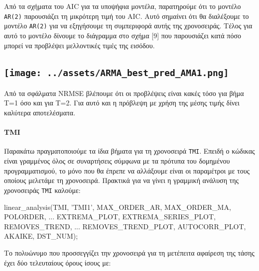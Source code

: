 \documentclass[11pt,]{article}
\newenvironment{Shaded}{}{}
\newcommand{\NormalTok}[1]{#1}
\newcommand{\StringTok}[1]{\textcolor[rgb]{0.25,0.44,0.63}{#1}}
\let\oldparagraph\paragraph
\renewcommand{\paragraph}[1]{\oldparagraph{#1}\mbox{}}
\begin{document}
Από τα σχήματα του AIC για τα υποψήφια μοντέλα, παρατηρούμε ότι το
μοντέλο \texttt{AR(2)} παρουσιάζει τη μικρότερη τιμή του AIC. Αυτό
σημαίνει ότι θα διαλέξουμε το μοντέλο \texttt{AR(2)} για να εξηγήσουμε
τη συμπεριφορά αυτής της χρονοσειράς. Τέλος για αυτό το μοντέλο δίνουμε
το διάγραμμα στο σχήμα {[}9{]} που παρουσιάζει κατά πόσο μπορεί να
προβλέψει μελλοντικές τιμές της εισόδου.

\hypertarget{ux3c0ux3c1ux3bfux3b2ux3bbux3adux3c8ux3b5ux3b9ux3c2-ux3c4ux3b9ux3bcux3ceux3bd-ux3b3ux3b9ux3b1-ux3c4ux3bf-ux3baux3b1ux3bbux3cdux3c4ux3b5ux3c1ux3bf-ux3bcux3bfux3bdux3c4ux3adux3bbux3bf}{%
\subsection{\texorpdfstring{\protect\texttt{[image: ../assets/ARMA\_best\_pred\_AMA1.png]}}{Προβλέψεις τιμών για το καλύτερο μοντέλο}}\label{ux3c0ux3c1ux3bfux3b2ux3bbux3adux3c8ux3b5ux3b9ux3c2-ux3c4ux3b9ux3bcux3ceux3bd-ux3b3ux3b9ux3b1-ux3c4ux3bf-ux3baux3b1ux3bbux3cdux3c4ux3b5ux3c1ux3bf-ux3bcux3bfux3bdux3c4ux3adux3bbux3bf}}

Από τα σφάλματα NRMSE βλέπουμε ότι οι προβλέψεις είναι κακές τόσο για
βήμα T=1 όσο και για T=2. Για αυτό και η πρόβλεψη με χρήση της μέσης
τιμής δίνει καλύτερα αποτελέσματα.

\hypertarget{tmi}{%
\paragraph{TMI}\label{tmi}}

Παρακάτω πραγματοποιούμε τα ίδια βήματα για τη χρονοσειρά \texttt{TMI}.
Επειδή ο κώδικας είναι γραμμένος όλος σε συναρτήσεις σύμφωνα με τα
πρότυπα του δομημένου προγραμματισμού, το μόνο που θα έπρεπε να
αλλάξουμε είναι οι παραμέτροι με τους οποίους μελετάμε τη χρονοσειρά.
Πρακτικά για να γίνει η γραμμική ανάλυση της χρονοσειράς \texttt{TMI}
καλούμε:

\begin{Shaded}
\begin{Highlighting}[]
\NormalTok{linear_analysis(TMI, }\StringTok{'TMI1'}\NormalTok{, MAX_ORDER_AR, MAX_ORDER_MA, POLORDER, ...}
\NormalTok{                EXTREMA_PLOT, EXTREMA_SERIES_PLOT, REMOVES_TREND, ...}
\NormalTok{                REMOVES_TREND_PLOT, AUTOCORR_PLOT, AKAIKE, DST_NUM);}
\end{Highlighting}
\end{Shaded}

Το πολυώνυμο που προσσεγγίζει την χρονοσειρά για τη μετέπειτα αφαίρεση
της τάσης έχει δύο τελευταίους όρους ίσους με:
\end{document}
